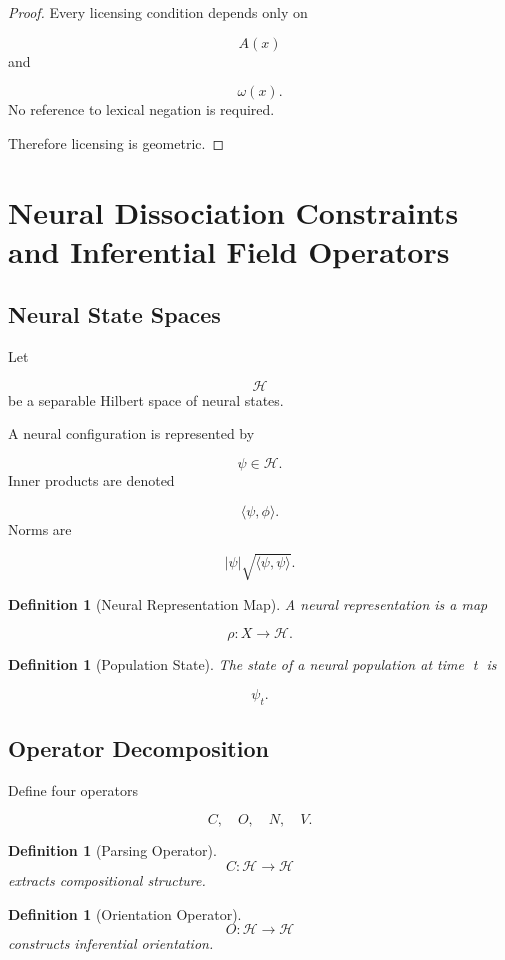 \documentclass[12pt]{article}
\newtheorem{definition}[theorem]{Definition}
\theoremstyle{remark}
\begin{document}
\begin{proof}
Every licensing condition depends only on

\[
A(x)
\]
and

\[
\omega(x).
\]
No reference to lexical negation is required.

Therefore licensing is geometric.
\end{proof}

\section{Neural Dissociation Constraints and Inferential Field Operators}

\subsection{Neural State Spaces}

Let

\[
\mathcal H
\]
be a separable Hilbert space of neural states.

A neural configuration is represented by

\[
\psi \in \mathcal H.
\]
Inner products are denoted

\[
\langle \psi,\phi\rangle.
\]
Norms are

\[
|\psi|
\sqrt{\langle\psi,\psi\rangle}.
\]

\begin{definition}[Neural Representation Map]
A neural representation is a map

\[
\rho:X\rightarrow\mathcal H.
\]
\end{definition}
\begin{definition}[Population State]
The state of a neural population at time t is

\[
\psi_t.
\]
\end{definition}
\subsection{Operator Decomposition}

Define four operators

\[
C,
\quad
O,
\quad
N,
\quad
V.
\]
\begin{definition}[Parsing Operator]
\[
C:\mathcal H\rightarrow\mathcal H
\]
extracts compositional structure.
\end{definition}

\begin{definition}[Orientation Operator]
\[
O:\mathcal H\rightarrow\mathcal H
\]
constructs inferential orientation.
\end{definition}
\end{document}
